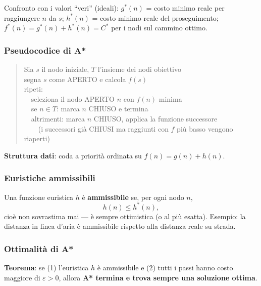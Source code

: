 \documentclass[11pt,a4paper]{report}
\begin{document}
Confronto con i valori ``veri'' (ideali): $g^*(n)$ = costo minimo reale per raggiungere $n$ da $s$; $h^*(n)$ = costo minimo reale del proseguimento; $f^*(n) = g^*(n)+h^*(n) = C^*$ per i nodi sul cammino ottimo.

\subsubsection*{Pseudocodice di A*}
\begin{quote}
\ttfamily
Sia $s$ il nodo iniziale, $T$ l'insieme dei nodi obiettivo\\
segna $s$ come APERTO e calcola $f(s)$\\
ripeti:\\
\ \ seleziona il nodo APERTO $n$ con $f(n)$ minima\\
\ \ se $n \in T$: marca $n$ CHIUSO e termina\\
\ \ altrimenti: marca $n$ CHIUSO, applica la funzione successore\\
\ \ \ \ (i successori già CHIUSI ma raggiunti con $f$ più basso vengono riaperti)
\end{quote}

\textbf{Struttura dati}: coda a priorità ordinata su $f(n)=g(n)+h(n)$.

\subsubsection*{Euristiche ammissibili}

Una funzione euristica $h$ è \textbf{ammissibile} se, per ogni nodo $n$,
\[
h(n) \le h^*(n),
\]
cioè non sovrastima mai --- è sempre ottimistica (o al più esatta). Esempio: la distanza in linea d'aria è ammissibile rispetto alla distanza reale su strada.

\subsubsection*{Ottimalità di A*}

\textbf{Teorema}: se (1) l'euristica $h$ è ammissibile e (2) tutti i passi hanno costo maggiore di $\varepsilon>0$, allora \textbf{A* termina e trova sempre una soluzione ottima}.
\end{document}
